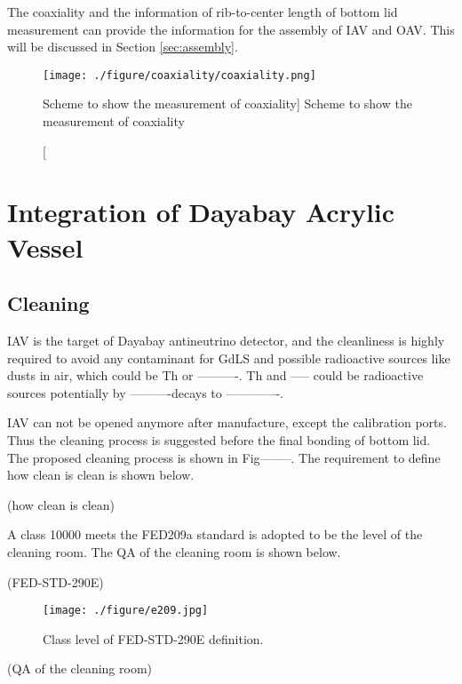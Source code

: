 The coaxiality and the information of rib-to-center length of bottom lid measurement can
provide the information for the assembly of IAV and OAV. This will be discussed in Section \ref{sec:assembly}.


\begin{figure}
    \centering
    \texttt{[image: ./figure/coaxiality/coaxiality.png]}
    \caption
    [Scheme to show the measurement of coaxiality]
    {Scheme to show the measurement of coaxiality}
    \label{fig:coaxiality.png}
    \end{figure}




\section {Integration of Dayabay Acrylic Vessel}
\subsection {Cleaning}

IAV is the target of Dayabay antineutrino detector,
and the cleanliness is highly required to avoid any contaminant
for GdLS and possible radioactive sources like dusts in air, which
could be Th or ----------. Th and ----- could be radioactive sources potentially
by ----------decays to -------------.

IAV can not be opened anymore after manufacture, except the calibration ports.
Thus the cleaning process is suggested before the final bonding of bottom lid.
The proposed cleaning process is shown in Fig--------. The requirement to define
how clean is clean is shown below.


(how clean is clean)



A class 10000 meets the FED209a standard is adopted to be the level of the cleaning room.
The QA of the cleaning room is shown below.

(FED-STD-290E)

\begin{figure}
    \centering
    \texttt{[image: ./figure/e209.jpg]}
    \caption{Class level of FED-STD-290E definition.}
    \label{e209.jpg}
    \end{figure}





(QA of the cleaning room)




